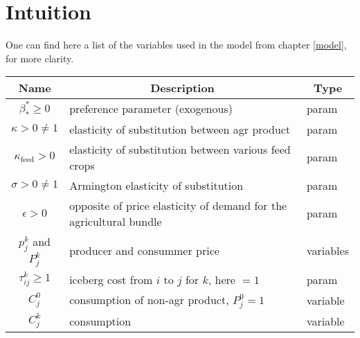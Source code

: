 \chapter{Intuition}\label{appendix:variables}

One can find here a list of the variables used in the model from chapter \ref{model}, for more clarity.

\begin{tabular}{c|l|l}
    \multicolumn{1}{c}{Name}                    & \multicolumn{1}{|c|}{Description}                                  & \multicolumn{1}{c}{Type} \\
    \hline
    $\beta_*^* \ge 0$                           & preference parameter (exogenous)                                   & param                    \\

    $\kappa > 0 \neq 1$                         & elasticity of substitution between agr product                     & param                    \\

    $\kappa_{\text{feed}} > 0$                  & elasticity of substitution between various feed crops              & param                    \\

    $\sigma > 0 \neq 1$                         & Armington elasticity of substitution                               & param                    \\

    $\epsilon > 0$                              & opposite of price elasticity of demand for the agricultural bundle & param                    \\

    $p_j^k$ and $P_j^k$                         & producer and consummer price                                       & variables                \\

    $\tau_{ij}^k \ge 1$                         & iceberg cost from $i$ to $j$ for $k$, here $=1$                    & param                    \\

    $C_j^0$                                     & consumption of non-agr product, $P_j^0 = 1$                        & variable                 \\

    $C_j^k$                                     & consumption                                                        & variable                 \\


\end{tabular}
